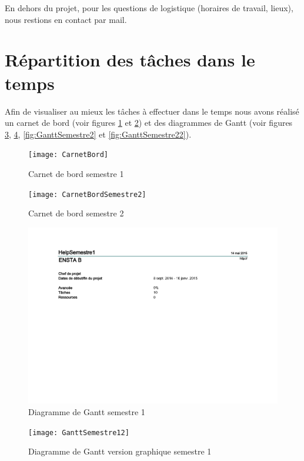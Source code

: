 En dehors du projet, pour les questions de logistique (horaires de travail, lieux), nous restions en contact par mail. 

\section{Répartition des tâches dans le temps}

Afin de visualiser au mieux les tâches à effectuer dans le temps nous avons réalisé un carnet de bord (voir figures \ref{fig:CarnetBord} et \ref{fig:CarnetBordS2}) et des diagrammes de Gantt (voir figures \ref{fig:Gantt}, \ref{fig:GanttGraphique}, \ref{fig:GanttSemestre2} et \ref{fig:GanttSemestre22}).
 
\begin{figure}[H]
  \centering
  \texttt{[image: CarnetBord]}
  \caption{Carnet de bord semestre 1}
  \label{fig:CarnetBord}
\end{figure}

\begin{figure}[H]
  \centering
  \texttt{[image: CarnetBordSemestre2]}
  \caption{Carnet de bord semestre 2}
  \label{fig:CarnetBordS2}
\end{figure}
 
\begin{figure}[H]
  \centering
  \includegraphics[scale=1]{GanttSemestre1}
  \caption{Diagramme de Gantt semestre 1}
  \label{fig:Gantt}
\end{figure}

\begin{figure}[H]
  \centering
  \texttt{[image: GanttSemestre12]}
  \caption{Diagramme de Gantt version graphique semestre 1}
  \label{fig:GanttGraphique}
\end{figure}

